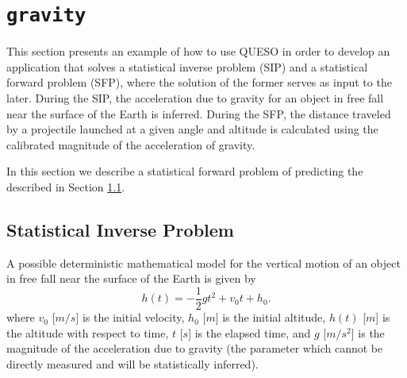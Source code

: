 
\section{\texttt{gravity}}\label{sec:example_gravity}

This section presents an example of how to use QUESO in order to develop an application that solves a
statistical inverse problem (SIP) and a statistical forward problem (SFP), where the solution of the former
serves as input to the later. During the SIP, the acceleration due to gravity for an object in free
fall near the surface of the Earth is inferred. During the SFP, the distance traveled by a projectile
launched at a given angle and altitude is calculated using the calibrated magnitude of the acceleration of gravity.


In this section we describe a statistical forward problem  of predicting the described in Section
\ref{sec:gravity-ip}.

\subsection{Statistical Inverse Problem}\label{sec:gravity-ip}



A possible deterministic mathematical model for the vertical motion of an object in free fall near the
surface of the Earth is given by
\begin{equation}\label{eq:gravity01}
h(t)=-\frac{1}{2} g t^2 + v_0 t + h_0.
\end{equation}
where
$v_0$ [$m/s$] is the initial velocity,
$h_0$ [$m$] is the initial altitude,
$h(t)$ [$m$] is the altitude with respect to time,
$t$ [$s$] is the elapsed time, and
$g$ [$m/s^2$] is the magnitude of the acceleration due to gravity
(the parameter which cannot be directly measured and will be statistically inferred).



